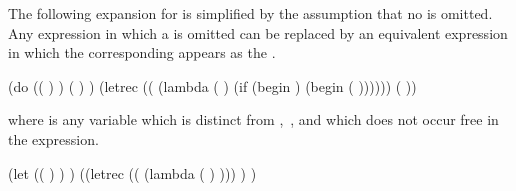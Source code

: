 The following expansion for  is simplified by the assumption
that no  is omitted.  Any  expression in which a
 is omitted can be replaced by an equivalent 
expression in which the corresponding  appears as
the . 

\begin{schemenoindent}
(do ((  ) 
     \dotsfoo)
    ( )
   \dotsfoo)
\iet  (letrec ((
                (lambda ( \dotsfoo)
                  (if 
                      (begin )
                      (begin 
                             \dotsfoo
                             (  \dotsfoo))))))
        (  \dotsfoo))%
\end{schemenoindent}
where  is any variable which is distinct from
,~\dotsfoo, and which does not occur free in the 
expression.

\begin{schemenoindent}
(let  (( ) \dotsfoo)
  )
\iet  ((letrec (( (lambda ( \dotsfoo)
                             )))
          )
        \dotsfoo)
\end{schemenoindent}

